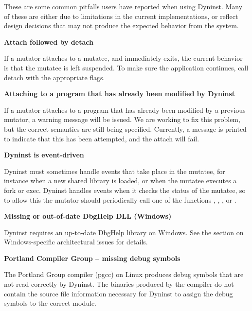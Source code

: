 These are some common pitfalls users have reported when using Dyninst.
Many of these are either due to limitations in the current
implementations, or reflect design decisions that may not
produce the expected behavior from the system.

\setlength{\leftskip}{0.5cm}

  \textbf{Attach followed by detach}

  If a mutator attaches to a mutatee, and immediately exits, the
  current behavior is that the mutatee is left suspended.
  To make sure the application continues, call detach with the appropriate flags.

  \textbf{Attaching to a program that has already been modified by Dyninst}

  If a mutator attaches to a program that has already been modified by
  a previous mutator, a warning message will be
  issued. We are working to fix this problem, but the correct semantics
  are still being specified. Currently, a message
  is printed to indicate that this has been attempted, and the attach will fail.

  \textbf{Dyninst is event-driven}

  Dyninst must sometimes handle events that take place in the mutatee,
  for instance when a new shared library is loaded,
  or when the mutatee executes a fork or exec. Dyninst handles events
  when it checks the status of the mutatee, so to
  allow this the mutator should periodically call one of the functions
  , ,
  , or .

  \textbf{Missing or out-of-date DbgHelp DLL (Windows)}

  Dyninst requires an up-to-date DbgHelp library on Windows. See the
  section on Windows-specific architectural
  issues for details.

  \textbf{Portland Compiler Group -- missing debug symbols}

  The Portland Group compiler (pgcc) on Linux produces debug symbols
  that are not read correctly by Dyninst. The
  binaries produced by the compiler do not contain the source file
  information necessary for Dyninst to assign the debug
  symbols to the correct module.

\setlength{\leftskip}{0cm}
